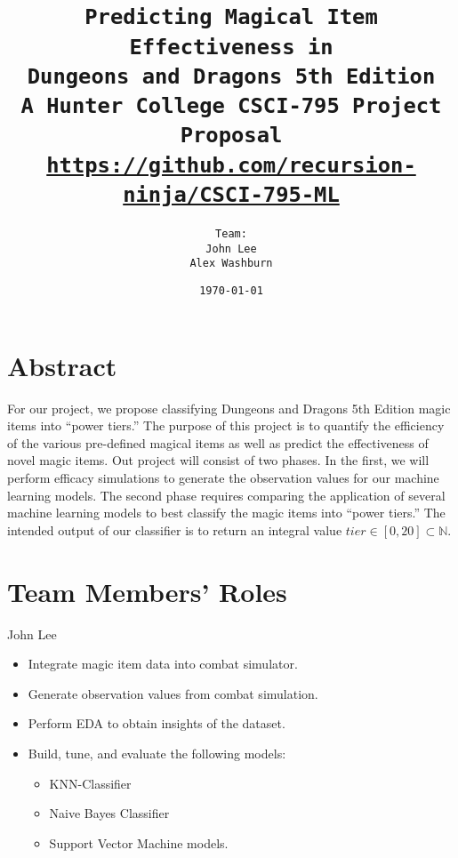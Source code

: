 \documentclass[12pt]{diazessay}
\title{\texttt{\LARGE{Predicting Magical Item Effectiveness in \\Dungeons and Dragons 5th Edition} \\\vspace{-0.35cm} {\large A Hunter College CSCI-795 Project Proposal}\\\normalsize\url{https://github.com/recursion-ninja/CSCI-795-ML}}} %
\author{\texttt{{\Huge Team:}\\\vspace*{-0.5em}
		John Lee \\\vspace*{-0.5em}
		Alex Washburn}} %
\date{\texttt{\today}} %
\begin{document}
\maketitle %

\vspace{-1cm}
\section*{Abstract}


For our project, we propose classifying Dungeons and Dragons 5th Edition magic items into ``power tiers.''
The purpose of this project is to quantify the efficiency of the various pre-defined magical items as well as predict the effectiveness of novel magic items.
Out project will consist of two phases. In the first, we will perform efficacy simulations to generate the observation values for our machine learning models.
The second phase requires comparing the application of several machine learning models to best classify the magic items into ``power tiers.''
The intended output of our classifier is to return an integral value $tier \in [0, 20] \subset \mathbb{N}$.

\section*{Team Members' Roles}

John Lee

\begin{itemize}

	\item Integrate magic item data into combat simulator.
	\item Generate observation values from combat simulation.
	\item Perform EDA to obtain insights of the dataset.
	\item Build, tune, and evaluate the following models:
	\begin{itemize}
		\item KNN-Classifier
		\item Naive Bayes Classifier
		\item Support Vector Machine models.
	\end{itemize}

\end{itemize}
\end{document}
